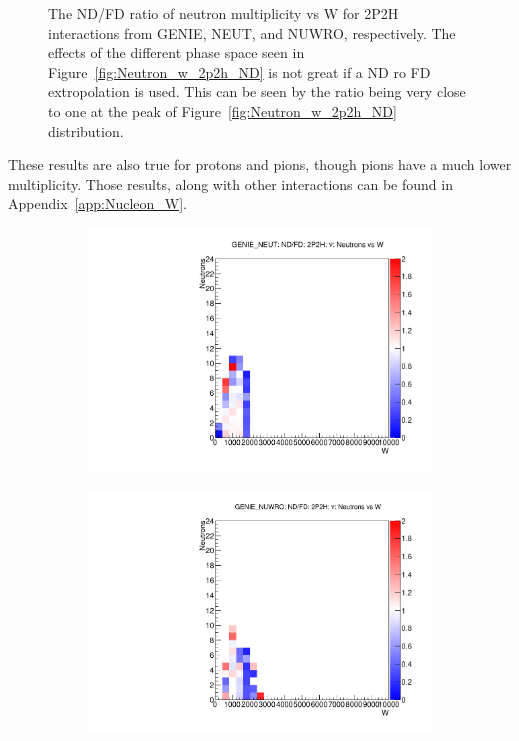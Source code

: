 \documentclass[12pt]{article}
\begin{document}
\begin{figure}
\begin{subfigure}[b]{0.32\textwidth}
\end{subfigure}
\caption{The ND/FD ratio of neutron multiplicity vs W for 2P2H interactions from GENIE, NEUT, and NUWRO, respectively.  The effects of the different phase space seen in Figure~\ref{fig:Neutron_w_2p2h_ND} is not great if a ND ro FD extropolation is used.  This can be seen by the ratio being very close to one at the peak of Figure~\ref{fig:Neutron_w_2p2h_ND} distribution.}
\label{fig:Neutron_w_2p2h_ND_FD}
\end{figure}

These results are also true for protons and pions, though pions have a much lower multiplicity.  
Those results, along with other interactions can be found in Appendix~\ref{app:Nucleon_W}.

\begin{figure}
\centering
\begin{subfigure}[b]{0.32\textwidth}
  \includegraphics[width=\textwidth]{nneutrons_w/Nneutrons_W_nuc_rest_2p2h_GENIE_NEUT_ND_FD_numu_norm.pdf}
\end{subfigure}
\begin{subfigure}[b]{0.32\textwidth}
  \includegraphics[width=\textwidth]{nneutrons_w/Nneutrons_W_nuc_rest_2p2h_GENIE_NUWRO_ND_FD_numu_norm.pdf}

\end{subfigure}
\end{figure}
\end{document}

